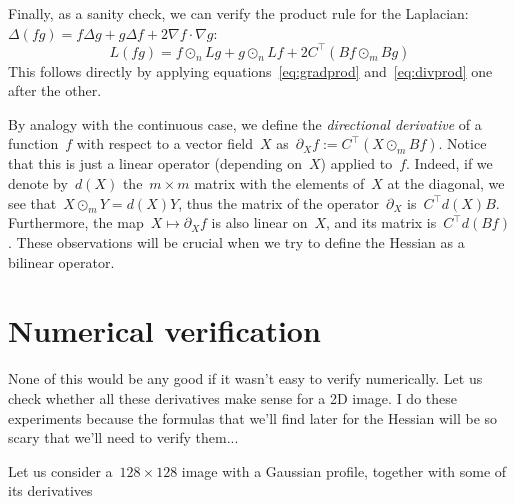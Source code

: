 Finally, as a sanity check, we can verify the
product rule for the Laplacian:~$\Delta\left(fg\right)=f\Delta g+g\Delta
f+2\nabla f\cdot\nabla g$:
\[
	L\left(fg\right)=
	f\odot_n Lg
	+
	g\odot_n Lf
	+2C^\top\left(Bf\odot_m Bg\right)
\]
This follows directly by applying equations~\eqref{eq:gradprod}
and~\eqref{eq:divprod} one after the other.

By analogy with the continuous case, we define the \emph{directional
derivative} of a function~$f$ with respect to a vector field~$X$
as~$\partial_Xf:=C^\top\left(X\odot_m Bf\right)$.  Notice that this is just a
linear operator (depending on~$X$) applied to~$f$.  Indeed, if we denote
by~$d(X)$ the~$m\times m$ matrix with the elements of~$X$ at the diagonal, we
see that~$X\odot_m Y=d(X)Y$, thus the matrix of the operator~$\partial_X$
is~$C^\top d(X)B$.  Furthermore, the map~$X\mapsto\partial_Xf$ is also linear
on~$X$, and its matrix is~$C^\top d\left(Bf\right)$.  These observations will
be crucial when we try to define the Hessian as a bilinear operator.


\clearpage
\section{Numerical verification}

None of this would be any good if it wasn't easy to verify numerically.  Let
us check whether all these derivatives make sense for a 2D image.  I do these
experiments because the formulas that we'll find later for the Hessian will
be so scary that we'll need to verify them...

Let us consider a~$128\times128$ image with a Gaussian profile, together with
some of its derivatives


